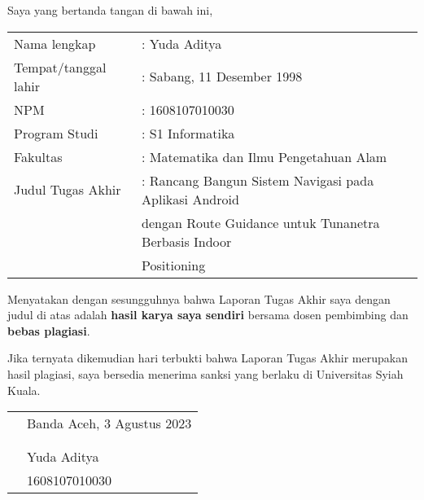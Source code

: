 \plagiasipage

\noindent Saya yang bertanda tangan di bawah ini,

\begin{table}[H]
\begin{tabular}{ll}
Nama lengkap         & : Yuda Aditya                                          \\
Tempat/tanggal lahir & : Sabang, 11 Desember 1998                             \\
NPM                  & : 1608107010030                                        \\
Program Studi        & : S1 Informatika                                         \\
Fakultas             & : Matematika dan Ilmu Pengetahuan Alam                 \\
Judul Tugas Akhir    & : Rancang Bangun Sistem Navigasi pada Aplikasi Android \\
                     &   dengan Route Guidance untuk Tunanetra Berbasis Indoor  \\
                     &   Positioning                                           
\end{tabular}
\end{table}


\noindent Menyatakan dengan sesungguhnya bahwa Laporan Tugas Akhir saya dengan judul di atas adalah \textbf{hasil karya saya sendiri} bersama dosen pembimbing dan \textbf{bebas plagiasi}.

\vspace{0.5cm}


\noindent Jika ternyata dikemudian hari terbukti bahwa Laporan Tugas Akhir merupakan hasil plagiasi, saya bersedia menerima sanksi yang berlaku di Universitas Syiah Kuala.


\vspace{1cm}


\begin{tabular}{p{7.5cm}l}
	&Banda Aceh, 3 Agustus 2023\\
	&\\
	&\\
	&Yuda Aditya\\
	&1608107010030
\end{tabular}